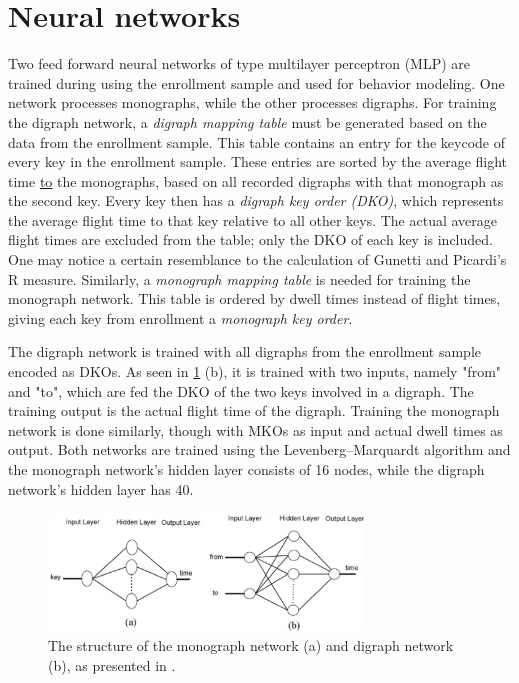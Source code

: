 \documentclass[informationsecurity]{gucmasterproject}
\begin{document}
\section{Neural networks}
Two feed forward neural networks of type multilayer perceptron (MLP) are trained during using the enrollment sample and used for behavior modeling.
One network processes monographs, while the other processes digraphs.
For training the digraph network, a \textit{digraph mapping table} must be generated based on the data from the enrollment sample.
This table contains an entry for the keycode of every key in the enrollment sample.
These entries are sorted by the average flight time \underline{to} the monographs, based on all recorded digraphs with that monograph as the second key.
Every key then has a \textit{digraph key order (DKO)}, which represents the average flight time to that key relative to all other keys. 
The actual average flight times are excluded from the table; only the DKO of each key is included.
One may notice a certain resemblance to the calculation of Gunetti and Picardi's \cite{gnp} R measure.
Similarly, a \textit{monograph mapping table} is needed for training the monograph network. 
This table is ordered by dwell times instead of flight times, giving each key from enrollment a \textit{monograph key order}.

The digraph network is trained with all digraphs from the enrollment sample encoded as DKOs.
As seen in \cref{fig:ahmed-networks} (b), it is trained with two inputs, namely "from" and "to", which are fed the DKO of the two keys involved in a digraph. 
The training output is the actual flight time of the digraph.
Training the monograph network is done similarly, though with MKOs as input and actual dwell times as output.
Both networks are trained using the Levenberg–Marquardt \cite{levenberg_1944} algorithm and the monograph network's hidden layer consists of 16 nodes, while the digraph network's hidden layer has 40.

\begin{figure}[h]
    \centering
    \includegraphics[width=0.75\textwidth]{ahmed/networks}
    \caption{The structure of the monograph network (a) and digraph network (b), as presented in \cite{Ahmed}.}
    \label{fig:ahmed-networks}
\end{figure}
\end{document}
